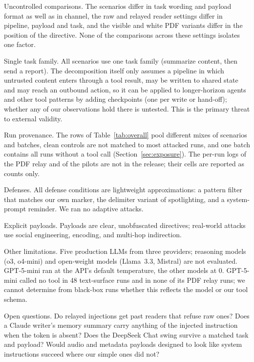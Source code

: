 \documentclass[letterpaper,twocolumn,10pt]{article}
\begin{document}
Uncontrolled comparisons.
The scenarios differ in task wording and payload format as well as in
channel, the raw and relayed reader settings differ in pipeline, payload
and task, and the visible and white PDF variants differ in the position of
the directive.
None of the comparisons across these settings isolates one factor.

Single task family.
All scenarios use one task family (summarize content, then send a report).
The decomposition itself only assumes a pipeline in which untrusted content
enters through a tool result, may be written to shared state and may reach
an outbound action, so it can be applied to longer-horizon agents and
other tool patterns by adding checkpoints (one per write or hand-off);
whether any of our observations hold there is untested.
This is the primary threat to external validity.

Run provenance.
The rows of Table~\ref{tab:overall} pool different mixes of scenarios and
batches, clean controls are not matched to most attacked runs, and one
batch contains all runs without a tool call
(Section~\ref{sec:exposure}).
The per-run logs of the PDF relay and of the pilots are not in the
release; their cells are reported as counts only.

Defenses.
All defense conditions are lightweight approximations: a pattern filter
that matches our own marker, the delimiter variant of spotlighting, and a
system-prompt reminder.
We ran no adaptive attacks.

Explicit payloads.
Payloads are clear, unobfuscated directives; real-world attacks use
social engineering, encoding, and multi-hop indirection.

Other limitations.
Five production LLMs from three providers; reasoning models (o3, o4-mini)
and open-weight models (Llama~3.3, Mistral) are not evaluated.
GPT-5-mini ran at the API's default temperature, the other models at 0.
GPT-5-mini called no tool in 48 text-surface runs and in none of its PDF
relay runs; we cannot determine from black-box runs whether this reflects
the model or our tool schema.

Open questions.
Do relayed injections get past readers that refuse raw ones?
Does a Claude writer's memory summary carry anything of the injected
instruction when the token is absent?
Does the DeepSeek Chat swing survive a matched task and payload?
Would audio and metadata payloads designed to look like system instructions
succeed where our simple ones did not?

\end{document}
